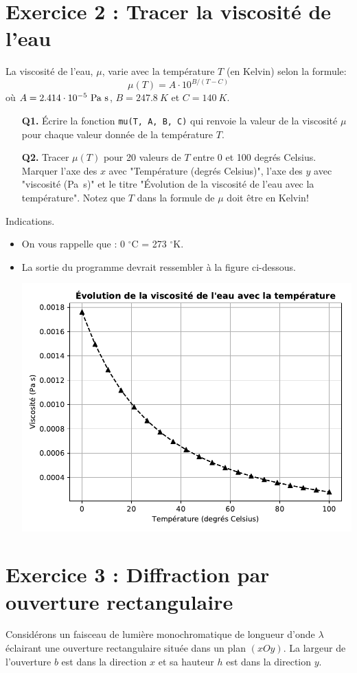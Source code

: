 \documentclass[a4paper,11pt]{article}
\theoremstyle{mytheor}
\begin{document}
\section*{Exercice 2 : Tracer la viscosité de l'eau}
La viscosité de l'eau, $\mu$, varie avec la température $T$ (en Kelvin) selon la formule:
\begin{equation}
\mu (T) = A\cdot 10^{B/(T-C)}
\end{equation}
où $A=2.414\cdot 10^{-5}\hbox{ Pa s}$, $B=247.8 \ K$ et $C = 140 \ K$.


\begin{itemize}
\item[\textbf{Q1.}] Écrire la fonction \texttt{mu(T, A, B, C)} qui renvoie la valeur de la viscosité $\mu$ pour chaque valeur donnée de la température $T$.
\item[\textbf{Q2.}] Tracer $\mu (T)$ pour 20 valeurs de $T$ entre 0 et 100 degrés Celsius. Marquer l'axe des $x$ avec "Température (degrés Celsius)", l'axe des $y$ avec "viscosité (Pa~s)" et le titre "Évolution de la viscosité de l'eau avec la température". Notez que $T$ dans la formule de $\mu$ doit être en Kelvin!
\end{itemize}

\begin{bclogo}[logo=\bclampe, couleurBarre=green, noborder=true, couleur=yellow!10]{Indications.}
\begin{itemize}
\item On vous rappelle que : 0 $^\circ$C = 273 $^\circ$K.
\item La sortie du programme devrait ressembler à la figure ci-dessous.

\includegraphics[width=0.7\linewidth]{figures/viscosity}
\end{itemize}
\end{bclogo}
\section*{Exercice 3 : Diffraction par ouverture rectangulaire}
Considérons un faisceau de lumière monochromatique de longueur d'onde $\lambda$ éclairant une ouverture rectangulaire située dans un plan $(xOy)$. La largeur de l'ouverture $b$ est dans la direction $x$ et sa hauteur $h$ est dans la direction $y$.
\end{document}
